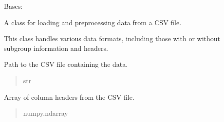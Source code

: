 \documentclass[letterpaper,10pt,english]{sphinxmanual}
\begin{document}
\begin{fulllineitems}
\label{\detokenize{calzone:calzone.utils.data_loader}}
\pysigstartsignatures
{}
\pysigstopsignatures
\sphinxAtStartPar
Bases: 

\sphinxAtStartPar
A class for loading and preprocessing data from a CSV file.

\sphinxAtStartPar
This class handles various data formats, including those with or without subgroup information and headers.

\begin{fulllineitems}
\label{\detokenize{calzone:calzone.utils.data_loader.data_path}}
\pysigstartsignatures
{}
\pysigstopsignatures
\sphinxAtStartPar
Path to the CSV file containing the data.
\begin{quote}\begin{description}
\sphinxAtStartPar
str

\end{description}\end{quote}

\end{fulllineitems}


\begin{fulllineitems}
\label{\detokenize{calzone:calzone.utils.data_loader.Header}}
\pysigstartsignatures
{}
\pysigstopsignatures
\sphinxAtStartPar
Array of column headers from the CSV file.
\begin{quote}\begin{description}
\sphinxAtStartPar
numpy.ndarray

\end{description}\end{quote}

\end{fulllineitems}



\end{fulllineitems}
\end{document}
